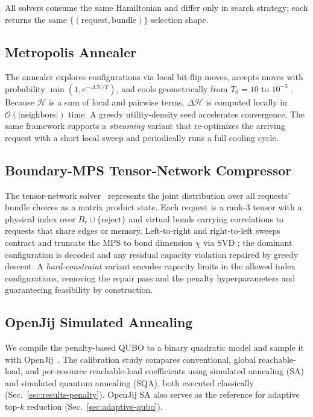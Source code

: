 \documentclass[twocolumn]{article}
\newcommand{\calH}{\mathcal{H}}
\begin{document}
All solvers consume the same Hamiltonian and differ only in search
strategy; each returns the same $\{(\text{request},\text{bundle})\}$
selection shape.

\subsection{Metropolis Annealer}
\label{sec:metropolis}

The annealer explores configurations via local bit-flip moves, accepts
moves with probability $\min(1, e^{-\Delta \calH/T})$, and cools
geometrically from $T_0 = 10$ to $10^{-3}$
\cite{metropolis1953equation,rosales2025quantum}.  Because $\calH$ is a
sum of local and pairwise terms, $\Delta\calH$ is computed locally in
$\mathcal{O}(|\text{neighbors}|)$ time.  A greedy utility-density seed
accelerates convergence.  The same framework supports a
\emph{streaming} variant that re-optimizes the arriving request with a
short local sweep and periodically runs a full cooling cycle.

\subsection{Boundary-MPS Tensor-Network Compressor}
\label{sec:tn}

The tensor-network solver~\cite{rosales2025quantum,hao2022quantum,
nakada2025quick} represents the joint distribution over all requests'
bundle choices as a matrix product state.  Each request is a rank-3
tensor with a physical index over $B_r \cup \{\text{reject}\}$ and
virtual bonds carrying correlations to requests that share edges or
memory.  Left-to-right and right-to-left sweeps contract and truncate
the MPS to bond dimension $\chi$ via SVD
\cite{white1992dmrg,vidal2003efficient}; the dominant configuration is
decoded and any residual capacity violation repaired by greedy
descent.  A \emph{hard-constraint} variant
\cite{nakada2025quick} encodes capacity limits in the allowed index
configurations, removing the repair pass and the penalty
hyperparameters and guaranteeing feasibility by construction.

\subsection{OpenJij Simulated Annealing}
\label{sec:openjij}

We compile the penalty-based QUBO to a binary quadratic model and
sample it with OpenJij~\cite{openjij}.  The calibration study compares
conventional, global reachable-load, and per-resource reachable-load
coefficients using simulated annealing (SA) and simulated quantum
annealing (SQA), both executed classically
(Sec.~\ref{sec:results-penalty}).  OpenJij SA also serves as the
reference for adaptive top-$k$ reduction
(Sec.~\ref{sec:adaptive-qubo}).
\end{document}
